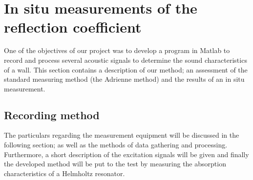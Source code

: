 \begin{comment}
\documentclass[12pt,a4paper]{article}
\usepackage{a4wide}
\usepackage{amsfonts, amsmath, amsthm}
\usepackage[english]{babel}
\usepackage{framed}
\usepackage[pdftex]{graphicx}
\usepackage{epstopdf}
\usepackage[font=small,format=plain,labelfont=bf,up,textfont=it,up]{caption}
\usepackage{wrapfig}
\usepackage{tocloft}
\usepackage{psfrag}
\usepackage{subfig}
\usepackage[latin1]{inputenc}
\usepackage{verbatim}

\usepackage{bbm}
\topmargin -15mm
\textwidth 16truecm
\textheight 24truecm
\setlength\parindent{0pt}
\setlength\parskip{0.20in plus0.05in minus0.05in}
\newcommand{\Z}{\mathbb{Z}}
\newcommand{\N}{\mathbb{N}}
\newcommand{\R}{\mathbb{R}}
\newcommand{\C}{\mathbb{C}}
\newcommand{\eps}{\varepsilon}
\fboxrule 1pt
\fboxsep 7pt
\pagenumbering{arabic}







\end{comment}


\section{In situ measurements of the reflection coefficient}
One of the objectives of our project was to develop a program in Matlab to record and process several acoustic signals to determine the sound characteristics of a wall. 
This section contains a description of our method; an assessment of the standard measuring method (the Adrienne method) and the results of an in situ measurement. 

\subsection{Recording method}
The particulars regarding the measurement equipment will be discussed in the following section; as well as the methods of data gathering and processing. Furthermore, a short description of the excitation signals will be given and finally the developed method will be put to the test by measuring the absorption characteristics of a Helmholtz resonator.

